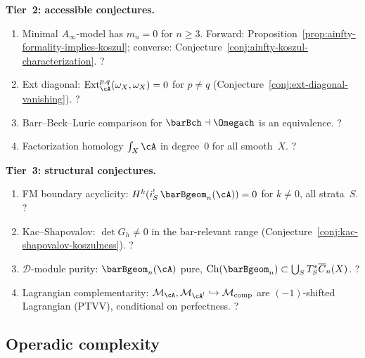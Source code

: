 \medskip\noindent
\textbf{Tier~2: accessible conjectures.}

\begin{enumerate}[label=\textup{(\roman*)},ref=\roman*,resume]
\item\label{item:kp-ainfty}
  Minimal $A_\infty$-model has $m_n = 0$ for $n \ge 3$.
  Forward: Proposition~\ref{prop:ainfty-formality-implies-koszul};
  converse: Conjecture~\ref{conj:ainfty-koszul-characterization}.
  \hfill ?
\item\label{item:kp-ext}
  Ext diagonal: $\operatorname{Ext}^{p,q}_\cA(\omega_X,\omega_X)=0$ for $p \neq q$
  (Conjecture~\ref{conj:ext-diagonal-vanishing}).
  \hfill ?
\item\label{item:kp-barrbeck}
  Barr--Beck--Lurie comparison for $\barBch \dashv \Omegach$ is an equivalence.
  \hfill ?
\item\label{item:kp-facthom}
  Factorization homology $\textstyle\int_X \cA$ in degree~$0$ for all smooth~$X$.
  \hfill ?
\end{enumerate}

\medskip\noindent
\textbf{Tier~3: structural conjectures.}

\begin{enumerate}[label=\textup{(\roman*)},ref=\roman*,resume]
\item\label{item:kp-fmbdy}
  FM boundary acyclicity: $H^k(i_S^!\,\barBgeom_n(\cA)) = 0$ for $k \neq 0$, all strata~$S$.
  \hfill ?
\item\label{item:kp-nullvec}
  Kac--Shapovalov: $\det G_h \neq 0$ in the bar-relevant range
  (Conjecture~\ref{conj:kac-shapovalov-koszulness}).
  \hfill ?
\item\label{item:kp-dmod}
  $\mathcal{D}$-module purity: $\barBgeom_n(\cA)$ pure, $\operatorname{Ch}(\barBgeom_n) \subset \bigcup_S T^*_S\overline{C}_n(X)$.
  \hfill ?
\item\label{item:kp-lagrangian}
  Lagrangian complementarity: $\mathcal{M}_\cA, \mathcal{M}_{\cA^!} \hookrightarrow \mathcal{M}_{\mathrm{comp}}$ are $(-1)$-shifted Lagrangian (PTVV), conditional on perfectness.
  \hfill ?
\end{enumerate}


\subsection{Operadic complexity}
\label{subsec:concordance-operadic-complexity}


